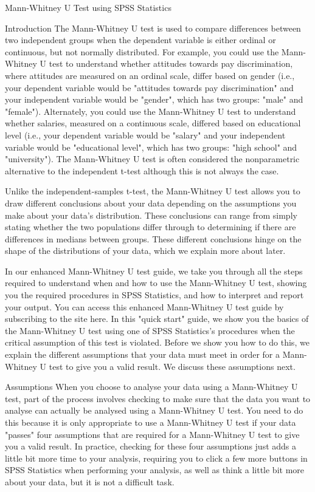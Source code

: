 \documentclass[]{article}
\begin{document}
Mann-Whitney U Test using SPSS Statistics

Introduction
The Mann-Whitney U test is used to compare differences between two independent groups when the dependent variable is either ordinal or continuous, but not normally distributed. For example, you could use the Mann-Whitney U test to understand whether attitudes towards pay discrimination, where attitudes are measured on an ordinal scale, differ based on gender (i.e., your dependent variable would be "attitudes towards pay discrimination" and your independent variable would be "gender", which has two groups: "male" and "female"). Alternately, you could use the Mann-Whitney U test to understand whether salaries, measured on a continuous scale, differed based on educational level (i.e., your dependent variable would be "salary" and your independent variable would be "educational level", which has two groups: "high school" and "university"). The Mann-Whitney U test is often considered the nonparametric alternative to the independent t-test although this is not always the case.

Unlike the independent-samples t-test, the Mann-Whitney U test allows you to draw different conclusions about your data depending on the assumptions you make about your data's distribution. These conclusions can range from simply stating whether the two populations differ through to determining if there are differences in medians between groups. These different conclusions hinge on the shape of the distributions of your data, which we explain more about later.

In our enhanced Mann-Whitney U test guide, we take you through all the steps required to understand when and how to use the Mann-Whitney U test, showing you the required procedures in SPSS Statistics, and how to interpret and report your output. You can access this enhanced Mann-Whitney U test guide by subscribing to the site here. In this "quick start" guide, we show you the basics of the Mann-Whitney U test using one of SPSS Statistics's procedures when the critical assumption of this test is violated. Before we show you how to do this, we explain the different assumptions that your data must meet in order for a Mann-Whitney U test to give you a valid result. We discuss these assumptions next.

Assumptions
When you choose to analyse your data using a Mann-Whitney U test, part of the process involves checking to make sure that the data you want to analyse can actually be analysed using a Mann-Whitney U test. You need to do this because it is only appropriate to use a Mann-Whitney U test if your data "passes" four assumptions that are required for a Mann-Whitney U test to give you a valid result. In practice, checking for these four assumptions just adds a little bit more time to your analysis, requiring you to click a few more buttons in SPSS Statistics when performing your analysis, as well as think a little bit more about your data, but it is not a difficult task.
\end{document}
